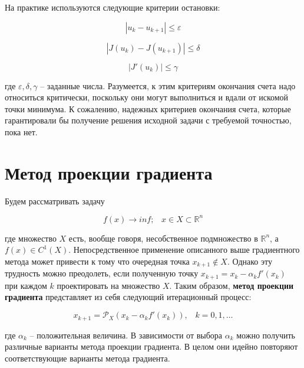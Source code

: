 \documentclass[a4paper, 12pt, titlepage]{article}
\theoremstyle{definition}
\theoremstyle{plain}
\theoremstyle{plain}
\begin{document}
На практике используются следующие критерии остановки:

\begin{equation}
 |u_{k} - u_{k + 1}| \leq \varepsilon
\end{equation}

\begin{equation}
 |J(u_{k}) - J(u_{k + 1})| \leq \delta
\end{equation}

\begin{equation}
 |J'(u_{k})| \leq \gamma
\end{equation}

где $\varepsilon, \delta, \gamma$ -- заданные числа. Разумеется, к этим 
критериям окончания счета надо относиться критически, поскольку они могут
выполниться и вдали от искомой точки минимума. К сожалению, надежных критериев
окончания счета, которые гарантировали бы получение решения исходной задачи с
требуемой точностью, пока нет.



\section{Метод проекции градиента}

Будем рассматривать задачу

\begin{equation}
 f(x) \to inf; \;\;\; x \in X \subset \mathbb{R}^{n}
\end{equation}

где множество $X$ есть, вообще говоря, несобственное подмножество в
$\mathbb{R}^{n}$, а $f(x) \in C^{1}(X)$. Непосредственное применение
описанного выше градиентного метода может привести к тому что очередная точка
$x_{k + 1} \notin X$. Однако эту трудность можно преодолеть, если полученную
точку $x_{k + 1} = x_{k} - \alpha_{k} f'(x_{k})$ при каждом $k$ проектировать
на множество $X$. Таким образом, \textbf{метод проекции градиента}
представляет из себя следующий итерационный процесс:

\begin{equation}
 x_{k + 1} = \mathcal{P}_{X}(x_{k} - \alpha_{k} f'(x_{k})), \;\;\;
 k = 0, 1, \ldots
\end{equation}

где $\alpha_{k}$ -- положительная величина. В зависимости от выбора
$\alpha_{k}$ можно получить различные варианты метода проекции градиента.
В целом они идейно повторяют соответствующие варианты метода градиента.
\end{document}
